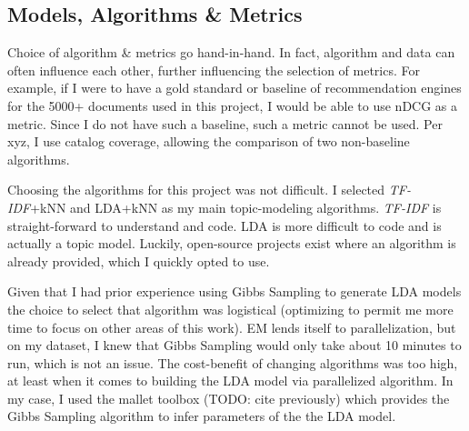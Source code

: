 \subsection{Models, Algorithms \& Metrics}
Choice of algorithm \& metrics go hand-in-hand. In fact, algorithm and data can often influence each other, further influencing the selection of metrics. For example, if I were to have a gold standard or baseline of recommendation engines for the 5000+ documents used in this project, I would be able to use nDCG as a metric. Since I do not have such a baseline, such a metric cannot be used. Per xyz, I use catalog coverage, allowing the comparison of two non-baseline algorithms.

Choosing the algorithms for this project was not difficult. I selected \emph{TF-IDF}+kNN and LDA+kNN as my main topic-modeling algorithms. \emph{TF-IDF} is straight-forward to understand and code. LDA is more difficult to code and is actually a topic model. Luckily, open-source projects exist where an algorithm is already provided, which I quickly opted to use.

Given that I had prior experience using Gibbs Sampling to generate LDA models \citep{bean5-LDA-ToT} the choice to select that algorithm was logistical (optimizing to permit me more time to focus on other areas of this work). EM lends itself to parallelization, but on my dataset, I knew that Gibbs Sampling would only take about 10 minutes to run, which is not an issue. The cost-benefit of changing algorithms was too high, at least when it comes to building the LDA model via parallelized algorithm. In my case, I used the mallet toolbox \citep{McCallumMALLET} (TODO: cite previously) which provides the Gibbs Sampling algorithm to infer parameters of the the LDA model.

